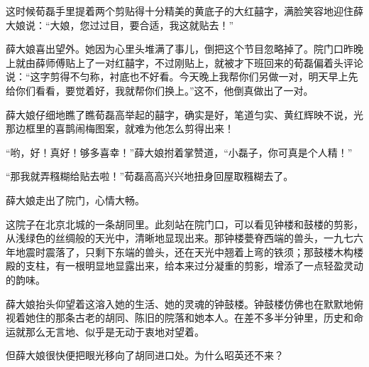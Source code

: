 \par 这时候荀磊手里提着两个剪贴得十分精美的黄底子的大红囍字，满脸笑容地迎住薛大娘说：“大娘，您过过目，要合适，我这就贴去！”
\par 薛大娘喜出望外。她因为心里头堆满了事儿，倒把这个节目忽略掉了。院门口昨晚上就由薛师傅贴上了一对红囍字，不过刚贴上，就被才下班回来的荀磊偏着头评论说：“这字剪得不匀称，衬底也不好看。今天晚上我帮你们另做一对，明天早上先给你们看看，要觉着好，我就帮你们换上。”这不，他倒真做出了一对。
\par 薛大娘仔细地瞧了瞧荀磊高举起的囍字，确实是好，笔道匀实、黄红辉映不说，光那边框里的喜鹊闹梅图案，就难为他怎么剪得出来！
\par “哟，好！真好！够多喜幸！”薛大娘拊着掌赞道，“小磊子，你可真是个人精！”
\par “那我就弄糨糊给贴去啦！”荀磊高高兴兴地扭身回屋取糨糊去了。
\par 薛大娘走出了院门，心情大畅。
\par 这院子在北京北城的一条胡同里。此刻站在院门口，可以看见钟楼和鼓楼的剪影，从浅绿色的丝绸般的天光中，清晰地显现出来。那钟楼甍脊西端的兽头，一九七六年地震时震落了，只剩下东端的兽头，还在天光中翘着上弯的铁须；那鼓楼木构楼殿的支柱，有一根明显地显露出来，给本来过分凝重的剪影，增添了一点轻盈灵动的韵味。
\par 薛大娘抬头仰望着这溶入她的生活、她的灵魂的钟鼓楼。钟鼓楼仿佛也在默默地俯视着她住的那条古老的胡同、陈旧的院落和她本人。在差不多半分钟里，历史和命运就那么无言地、似乎是无动于衷地对望着。
\par 但薛大娘很快便把眼光移向了胡同进口处。为什么昭英还不来？

